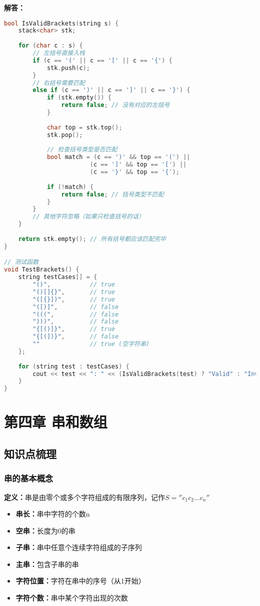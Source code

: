 \documentclass[12pt,a4paper]{amsart}
\begin{document}
\textbf{解答：}
\begin{lstlisting}[language=C++]
bool IsValidBrackets(string s) {
    stack<char> stk;
    
    for (char c : s) {
        // 左括号直接入栈
        if (c == '(' || c == '[' || c == '{') {
            stk.push(c);
        }
        // 右括号需要匹配
        else if (c == ')' || c == ']' || c == '}') {
            if (stk.empty()) {
                return false; // 没有对应的左括号
            }
            
            char top = stk.top();
            stk.pop();
            
            // 检查括号类型是否匹配
            bool match = (c == ')' && top == '(') ||
                        (c == ']' && top == '[') ||
                        (c == '}' && top == '{');
            
            if (!match) {
                return false; // 括号类型不匹配
            }
        }
        // 其他字符忽略（如果只检查括号的话）
    }
    
    return stk.empty(); // 所有括号都应该匹配完毕
}

// 测试函数
void TestBrackets() {
    string testCases[] = {
        "()",           // true
        "()[]{}",       // true
        "([{}])",       // true
        "([)]",         // false
        "(((",          // false
        ")))",          // false
        "{[()]}",       // true
        "{[(])}",       // false
        ""              // true (空字符串)
    };
    
    for (string test : testCases) {
        cout << test << ": " << (IsValidBrackets(test) ? "Valid" : "Invalid") << endl;
    }
}
\end{lstlisting}

\section{第四章 串和数组}

\subsection{知识点梳理}

\subsubsection{串的基本概念}
\textbf{定义：}串是由零个或多个字符组成的有限序列，记作$S=''c_1c_2\ldots c_n''$

\begin{itemize}
\item \textbf{串长：}串中字符的个数n
\item \textbf{空串：}长度为0的串
\item \textbf{子串：}串中任意个连续字符组成的子序列
\item \textbf{主串：}包含子串的串
\item \textbf{字符位置：}字符在串中的序号（从1开始）
\item \textbf{字符个数：}串中某个字符出现的次数
\end{itemize}
\end{document}
